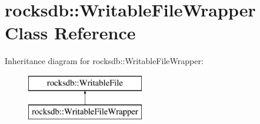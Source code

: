 \hypertarget{classrocksdb_1_1WritableFileWrapper}{}\section{rocksdb\+:\+:Writable\+File\+Wrapper Class Reference}
\label{classrocksdb_1_1WritableFileWrapper}
Inheritance diagram for rocksdb\+:\+:Writable\+File\+Wrapper\+:\begin{figure}[H]
\begin{center}
\leavevmode
\includegraphics[height=2.000000cm]{classrocksdb_1_1WritableFileWrapper}
\end{center}
\end{figure}
